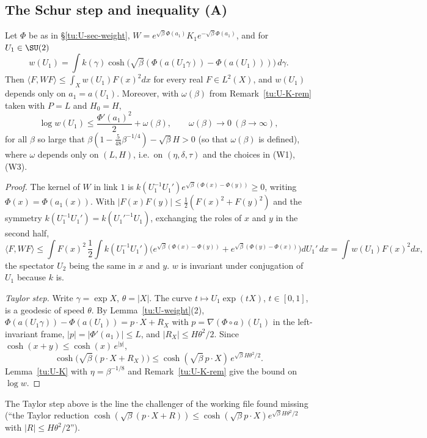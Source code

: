 \subsection{The Schur step and inequality (A)}

\begin{lemma}\label{tu:U-schur}
Let $\Phi$ be as in \S\ref{tu:U-sec-weight}, $W=e^{\sqrt\beta\Phi(a_1)}K_1e^{-\sqrt\beta\Phi(a_1)}$, and for $U_1\in\SU(2)$
\[
w(U_1)=\int k(\gamma)\cosh\bigl(\sqrt\beta(\Phi(a(U_1\gamma))-\Phi(a(U_1)))\bigr)\,d\gamma .
\]
Then $\langle F,WF\rangle\le\int_Xw(U_1)F(x)^2dx$ for every real $F\in L^2(X)$, and $w(U_1)$ depends only on
$a_1=a(U_1)$. Moreover, with $\omega(\beta)$ from Remark~\ref{tu:U-K-rem} taken with $P=L$ and $H_0=H$,
\[
\log w(U_1)\le\frac{\Phi'(a_1)^2}{2}+\omega(\beta),\qquad\omega(\beta)\to0\ (\beta\to\infty),
\]
for all $\beta$ so large that $\beta(1-\frac5{48}\beta^{-1/4})-\sqrt\beta H>0$ (so that $\omega(\beta)$ is defined),
where $\omega$ depends only on $(L,H)$, i.e.\ on $(\eta,\delta,\tau)$ and the choices in (W1), (W3).
\end{lemma}

\begin{proof}
The kernel of $W$ in link $1$ is $k(U_1^{-1}U_1')e^{\sqrt\beta(\Phi(x)-\Phi(y))}\ge0$, writing $\Phi(x)=\Phi(a_1(x))$. With
$|F(x)F(y)|\le\frac12(F(x)^2+F(y)^2)$ and the symmetry $k(U_1^{-1}U_1')=k(U_1'^{-1}U_1)$, exchanging the roles of
$x$ and $y$ in the second half,
\[
\langle F,WF\rangle\le\int F(x)^2\,\frac12\int k(U_1^{-1}U_1')\bigl(e^{\sqrt\beta(\Phi(x)-\Phi(y))}+e^{\sqrt\beta(\Phi(y)-\Phi(x))}\bigr)dU_1'\,dx
=\int w(U_1)F(x)^2dx ,
\]
the spectator $U_2$ being the same in $x$ and $y$. $w$ is invariant under conjugation of $U_1$ because $k$ is.

\emph{Taylor step.} Write $\gamma=\exp X$, $\theta=|X|$. The curve $t\mapsto U_1\exp(tX)$, $t\in[0,1]$, is a geodesic of
speed $\theta$. By Lemma~\ref{tu:U-weight}(2), $\Phi(a(U_1\gamma))-\Phi(a(U_1))=p\cdot X+R_X$ with
$p=\nabla(\Phi\circ a)(U_1)$ in the left-invariant frame, $|p|=|\Phi'(a_1)|\le L$, and $|R_X|\le H\theta^2/2$. Since
$\cosh(x+y)\le\cosh(x)\,e^{|y|}$,
\[
\cosh\bigl(\sqrt\beta(p\cdot X+R_X)\bigr)\le\cosh(\sqrt\beta\,p\cdot X)\,e^{\sqrt\beta H\theta^2/2}.
\]
Lemma~\ref{tu:U-K} with $\eta=\beta^{-1/8}$ and Remark~\ref{tu:U-K-rem} give the bound on $\log w$.
\end{proof}

\begin{remark}
The Taylor step above is the line the challenger of the working file found missing (``the Taylor reduction
$\cosh(\sqrt\beta(p\cdot X+R))\le\cosh(\sqrt\beta p\cdot X)e^{\sqrt\beta H\theta^2/2}$ with $|R|\le H\theta^2/2$'').
\end{remark}

